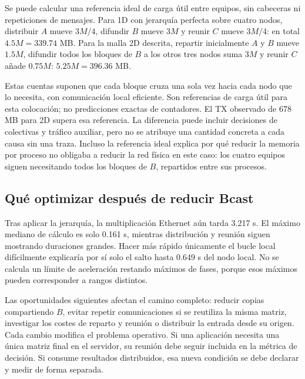 Se puede calcular una referencia ideal de carga útil entre equipos, sin cabeceras ni repeticiones de mensajes. Para 1D con jerarquía perfecta sobre cuatro nodos, distribuir $A$ mueve $3M/4$, difundir $B$ mueve $3M$ y reunir $C$ mueve $3M/4$: en total $4.5M=339.74$ MB. Para la malla 2D descrita, repartir inicialmente $A$ y $B$ mueve $1.5M$, difundir todos los bloques de $B$ a los otros tres nodos suma $3M$ y reunir $C$ añade $0.75M$: $5.25M=396.36$ MB.

Estas cuentas suponen que cada bloque cruza una sola vez hacia cada nodo que lo necesita, con comunicación local eficiente. Son referencias de carga útil para esta colocación; no predicciones exactas de contadores. El TX observado de 678 MB para 2D supera esa referencia. La diferencia puede incluir decisiones de colectivas y tráfico auxiliar, pero no se atribuye una cantidad concreta a cada causa sin una traza. Incluso la referencia ideal explica por qué reducir la memoria por proceso no obligaba a reducir la red física en este caso: los cuatro equipos siguen necesitando todos los bloques de $B$, repartidos entre sus procesos.

\subsection{Qué optimizar después de reducir Bcast}

Tras aplicar la jerarquía, la multiplicación Ethernet aún tarda 3.217 s. El máximo mediano de cálculo es solo 0.161 s, mientras distribución y reunión siguen mostrando duraciones grandes. Hacer más rápido únicamente el bucle local difícilmente explicaría por sí solo el salto hasta 0.649 s del nodo local. No se calcula un límite de aceleración restando máximos de fases, porque esos máximos pueden corresponder a rangos distintos.

Las oportunidades siguientes afectan el camino completo: reducir copias compartiendo $B$, evitar repetir comunicaciones si se reutiliza la misma matriz, investigar los costes de reparto y reunión o distribuir la entrada desde su origen. Cada cambio modifica el problema operativo. Si una aplicación necesita una única matriz final en el servidor, su reunión debe seguir incluida en la métrica de decisión. Si consume resultados distribuidos, esa nueva condición se debe declarar y medir de forma separada.

